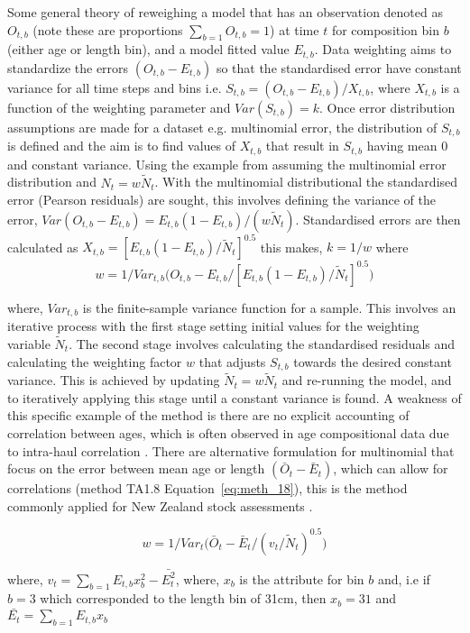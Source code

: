 \documentclass[12pt,preprint,authoryear]{article}
\begin{document}
Some general theory of reweighing a model that has an observation denoted as $O_{t,b}$ (note these are proportions \(\sum_{b = 1}O_{t,b} = 1 \)) at time $t$ for composition bin $b$ (either age or length bin), and a model fitted value $E_{t,b}$. Data weighting aims to standardize the errors $(O_{t,b} - E_{t,b})$ so that the standardised error have constant variance for all time steps and bins i.e. $S_{t,b} = (O_{t,b} - E_{t,b}) /X_{t,b}$, where $X_{t,b}$ is a function of the weighting parameter and $Var(S_{t,b}) = k$. Once error distribution assumptions are made for a dataset e.g. multinomial error, the distribution of $S_{t,b}$ is defined and the aim is to find values of $X_{t,b}$ that result in  $S_{t,b}$ having mean 0 and constant variance.  Using the example from \cite{mcallister1997bayesian} assuming the multinomial error distribution and $N_t = w\tilde{N}_t$. With the multinomial distributional the standardised error (Pearson residuals) are sought, this involves defining the variance of the error, $Var(O_{t,b} - E_{t,b}) = E_{t,b}(1 - E_{t,b})/(w \tilde{N}_t)$. Standardised errors are then calculated as $X_{t,b} =  \left[E_{t,b}(1 - E_{t,b}) / \tilde{N}_t\right]^{0.5}$ this makes, $k = 1/w$ where 
\[
w = 1/ Var_{t,b}\bigg(O_{t,b} - E_{t,b} / \left[E_{t,b}(1 - E_{t,b}) / \tilde{N}_t\right]^{0.5}\bigg)
\]

where, $Var_{t,b}$ is the finite-sample variance function for a sample. This involves an iterative process with the first stage setting initial values for the weighting variable $\tilde{N}_t$. The second stage involves calculating the standardised residuals and calculating the weighting factor $w$ that adjusts $S_{t,b}$ towards the desired constant variance. This is achieved by updating $\tilde{N}_t = w\tilde{N}_t$ and re-running the model, and to iteratively applying this stage until a constant variance is found. A weakness of this specific example of the method is there are no explicit accounting of correlation between ages, which is often observed in age compositional data due to intra-haul correlation \citep{pennington1994assessing}. There are alternative formulation for multinomial that focus on the error between mean age or length $(\bar{O}_{t} - \bar{E}_{t})$, which can allow for correlations (method TA1.8 \cite{francis2011data} Equation~\ref{eq:meth_18}), this is the method commonly applied for New Zealand stock assessments \citep{plenary_14}.

\begin{equation}\label{eq:meth_18}
w = 1/ Var_{t}\bigg(\bar{O}_{t} - \bar{E}_{t} / \left(v_t /\tilde{N}_t  \right)^{0.5}\bigg)
\end{equation}

where, \(v_t = \sum_{b = 1} E_{t,b}x_b^2 - \bar{E_t^2}\), where, \(x_b\) is the attribute for bin \(b\) and, i.e if \(b = 3\) which corresponded to the length bin of 31cm, then \(x_b = 31\) and \(\bar{E_t} = \sum_{b = 1}  E_{t,b}x_b \)


\end{document}
